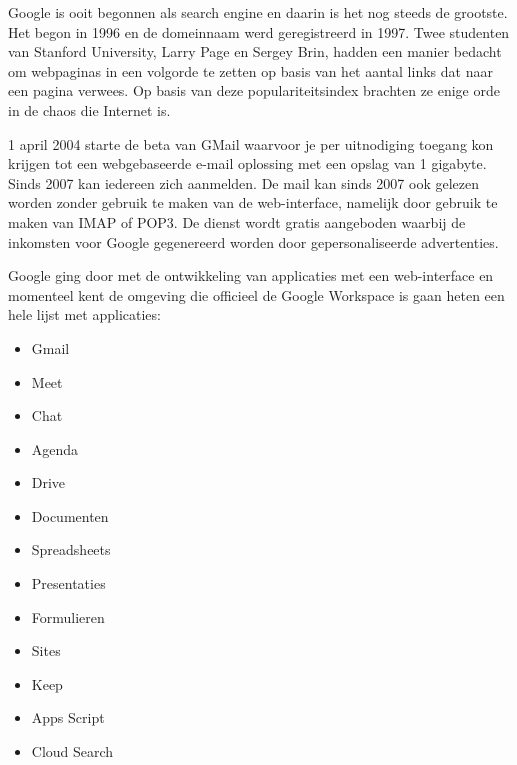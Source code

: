Google is ooit begonnen als search engine en daarin is het nog steeds de grootste. Het begon in 1996 en de domeinnaam werd geregistreerd in 1997. Twee studenten van Stanford University, Larry Page en Sergey Brin, hadden een manier bedacht om webpaginas in een volgorde te zetten op basis van het aantal links dat naar een pagina verwees. Op basis van deze populariteitsindex brachten ze enige orde in de chaos die Internet is.

1 april 2004 starte de beta van GMail waarvoor je per uitnodiging toegang kon krijgen tot een webgebaseerde e-mail oplossing met een opslag van 1 gigabyte. Sinds 2007 kan iedereen zich aanmelden. De mail kan sinds 2007 ook gelezen worden zonder gebruik te maken van de web-interface, namelijk door gebruik te maken van IMAP of POP3. De dienst wordt gratis aangeboden waarbij de inkomsten voor Google gegenereerd worden door gepersonaliseerde advertenties.

Google ging door met de ontwikkeling van applicaties met een web-interface en momenteel kent de omgeving die officieel de Google Workspace is gaan heten een hele lijst met applicaties:
\begin{itemize}
    \item Gmail
    \item Meet
    \item Chat
    \item Agenda
    \item Drive
    \item Documenten
    \item Spreadsheets
    \item Presentaties
    \item Formulieren
    \item Sites
    \item Keep
    \item Apps Script
    \item Cloud Search
\end{itemize}
